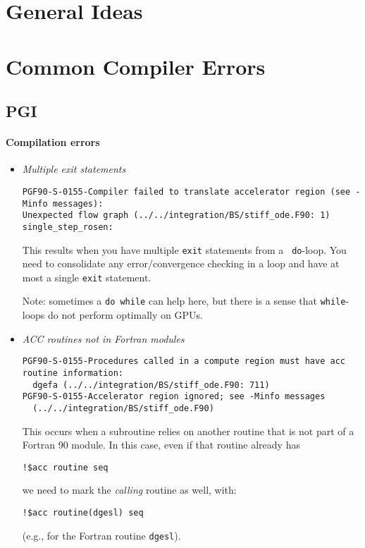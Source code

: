 \section{General Ideas}



\section{Common Compiler Errors}

\subsection{PGI}

\paragraph{Compilation errors}

\begin{itemize}

\item {\em Multiple exit statements}

\begin{verbatim}
PGF90-S-0155-Compiler failed to translate accelerator region (see -Minfo messages): 
Unexpected flow graph (../../integration/BS/stiff_ode.F90: 1)
single_step_rosen:
\end{verbatim}
This results when you have multiple {\tt exit} statements from a {\tt
  do}-loop.  You need to consolidate any error/convergence checking in
a loop and have at most a single {\tt exit} statement.

Note: sometimes a {\tt do while} can help here, but there is a sense
that {\tt while}-loops do not perform optimally on GPUs.

\item {\em ACC routines not in Fortran modules}

\begin{verbatim}
PGF90-S-0155-Procedures called in a compute region must have acc routine information: 
  dgefa (../../integration/BS/stiff_ode.F90: 711)
PGF90-S-0155-Accelerator region ignored; see -Minfo messages  
  (../../integration/BS/stiff_ode.F90)
\end{verbatim}

This occurs when a subroutine relies on another routine that is not part
of a Fortran 90 module.  In this case, even if that routine already has
\begin{verbatim}
!$acc routine seq
\end{verbatim}
we need to mark the {\em calling} routine as well, with:
\begin{verbatim}
!$acc routine(dgesl) seq
\end{verbatim}
(e.g., for the Fortran routine {\tt dgesl}).
\end{itemize}


